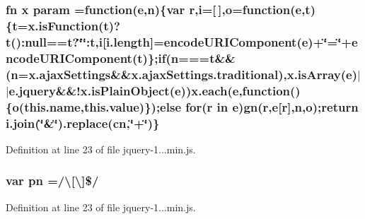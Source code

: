 \subsubsection[{param}]{ {\bf fn} {\bf x} param =function({\bf e},n)\{var r,{\bf i}=\mbox{[}$\,$\mbox{]},{\bf o}=function({\bf e},{\bf t})\{{\bf t}=x.\+is\+Function({\bf t})?{\bf t}()\+:null=={\bf t}?\char`\"{}\char`\"{}\+:{\bf t},{\bf i}\mbox{[}i.\+length\mbox{]}=encode\+U\+R\+I\+Component({\bf e})+\char`\"{}=\char`\"{}+encode\+U\+R\+I\+Component({\bf t})\};{\bf if}(n==={\bf t}\&\&(n=x.\+ajax\+Settings\&\&x.\+ajax\+Settings.\+traditional),x.\+is\+Array({\bf e})$\vert$$\vert$e.\+jquery\&\&!x.\+is\+Plain\+Object({\bf e})){\bf x.\+each}({\bf e},function()\{{\bf o}(this.\+name,this.\+value)\});{\bf else} for(r in {\bf e}){\bf gn}(r,{\bf e}\mbox{[}r\mbox{]},n,{\bf o});return i.\+join(\char`\"{}\&\char`\"{}).replace({\bf cn},\char`\"{}+\char`\"{})\}}\label{obj_2_release_2_package_2_package_tmp_2_scripts_2jquery-1_810_82_8min_8js_ae8915303d11557d1b001bc56b6195251}


Definition at line 23 of file jquery-\/1...\+min.\+js.

\hypertarget{obj_2_release_2_package_2_package_tmp_2_scripts_2jquery-1_810_82_8min_8js_a6a40831f7c967a457dbbd3b5e6f287d7}{}
\subsubsection[{pn}]{\setlength{\rightskip}{0pt plus 5cm}var pn =/\textbackslash{}\mbox{[}\textbackslash{}\mbox{]}\$/}\label{obj_2_release_2_package_2_package_tmp_2_scripts_2jquery-1_810_82_8min_8js_a6a40831f7c967a457dbbd3b5e6f287d7}


Definition at line 23 of file jquery-\/1...\+min.\+js.

\hypertarget{obj_2_release_2_package_2_package_tmp_2_scripts_2jquery-1_810_82_8min_8js_ac7f66efc33d974809d85fc5bdb00c6eb}{}

